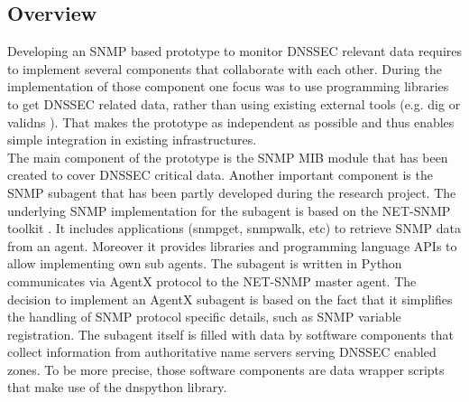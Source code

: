 \subsection{Overview}
\label{section:overview}
Developing an SNMP based prototype to monitor DNSSEC relevant data requires to implement several components that collaborate with each other. During the implementation of those component one focus was to use programming libraries to get DNSSEC related data, rather than using existing external tools (e.g. dig \cite{dig} or validns \cite{validns}). That makes the prototype as independent as possible and thus enables simple integration in existing infrastructures. 
\\
The main component of the prototype is the SNMP MIB module that has been created to cover DNSSEC critical data. Another important component is the SNMP subagent that has been partly developed during the research project. 
The underlying SNMP implementation for the subagent is based on the NET-SNMP toolkit \cite{net-snmp}. It includes applications (snmpget, snmpwalk, etc) to retrieve SNMP data from an agent. Moreover it provides libraries and programming language APIs to allow implementing own sub agents. 
The subagent is written in Python communicates via AgentX \cite{agentx} protocol to the NET-SNMP master agent. The decision to implement an AgentX subagent is based on the fact that it simplifies the handling of SNMP protocol specific details, such as SNMP variable registration. The subagent itself is filled with data by sotftware components that collect information from authoritative name servers serving DNSSEC enabled zones. To be more precise, those software components are data wrapper scripts that make use of the dnspython \cite{dnspython} library.

